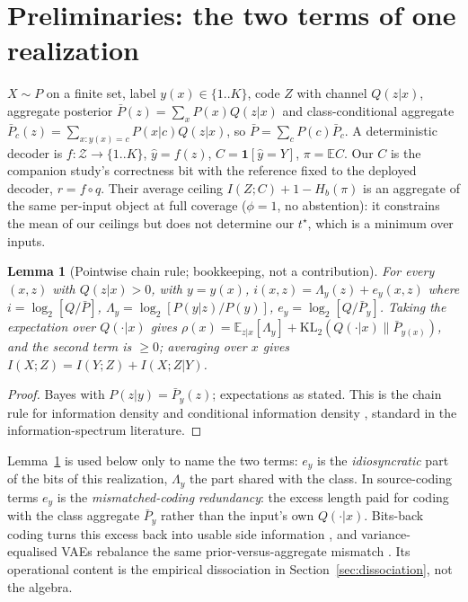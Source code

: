 \documentclass[11pt]{article}
\newtheorem{lemma}{Lemma}
\providecommand{\E}{\mathbb{E}}
\providecommand{\KL}{\mathrm{KL}}
\begin{document}
\section{Preliminaries: the two terms of one realization}
$X\sim P$ on a finite set, label $y(x)\in\{1..K\}$, code $Z$ with channel $Q(z|x)$, aggregate
posterior $\bar P(z)=\sum_x P(x)Q(z|x)$ and class-conditional aggregate
$\bar P_c(z)=\sum_{x:y(x)=c}P(x|c)Q(z|x)$, so $\bar P=\sum_c P(c)\bar P_c$. A deterministic
decoder is $f:\mathcal Z\to{\{1..K\}}$, $\hat y=f(z)$, $C=\mathbf 1[\hat y=Y]$, $\pi=\E C$.
Our $C$ is the companion study's correctness bit with the reference fixed to the deployed decoder,
$r=f\circ q$. Their average ceiling $I(Z;C)+1-H_b(\pi)$ is an aggregate of the same per-input
object at full coverage ($\phi=1$, no abstention): it constrains the mean of our ceilings but does
not determine our $t^\star$, which is a minimum over inputs.

\begin{lemma}[Pointwise chain rule; bookkeeping, not a contribution]\label{lem:chain}
For every $(x,z)$ with $Q(z|x)>0$, with $y=y(x)$,
$i(x,z)=\Lambda_y(z)+e_y(x,z)$ where
$i=\log_2\![Q/\bar P]$, $\Lambda_y=\log_2[P(y|z)/P(y)]$, $e_y=\log_2\![Q/\bar P_y]$.
Taking the expectation over $Q(\cdot|x)$ gives
$\rho(x)=\E_{z|x}[\Lambda_y]+\KL_2(Q(\cdot|x)\|\bar P_{y(x)})$, and the second term is
$\ge0$; averaging over $x$ gives $I(X;Z)=I(Y;Z)+I(X;Z|Y)$.
\end{lemma}
\begin{proof}
Bayes with $P(z|y)=\bar P_y(z)$; expectations as stated. This is the chain rule for
information density and conditional information density \citep{hellstrom2021,verdu2012},
standard in the information-spectrum literature.
\end{proof}
Lemma~\ref{lem:chain} is used below only to name the two terms: $e_y$ is the
\emph{idiosyncratic} part of the bits of this realization, $\Lambda_y$ the part shared with the
class. In source-coding terms $e_y$ is the \emph{mismatched-coding redundancy}: the excess length
paid for coding with the class aggregate $\bar P_y$ rather than the input's own $Q(\cdot|x)$.
Bits-back coding turns this excess back into usable side information \citep{bitsback2021}, and
variance-equalised VAEs rebalance the same prior-versus-aggregate mismatch \citep{lambdavae2026}.
Its operational content is the empirical dissociation in Section~\ref{sec:dissociation},
not the algebra.
\end{document}
